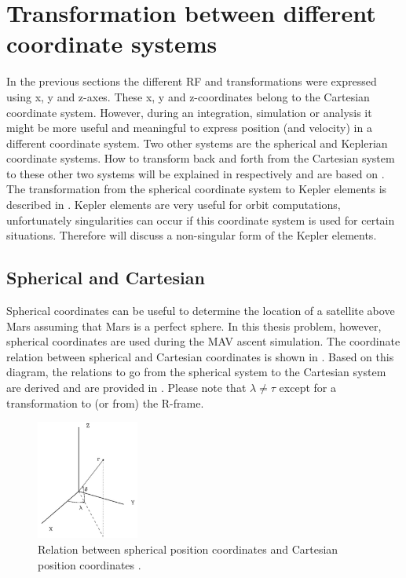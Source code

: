 \section{Transformation between different coordinate systems}
\label{sec:transsys}
In the previous sections the different \ac{RF} and transformations were expressed using x, y and z-axes. These x, y and z-coordinates belong to the Cartesian coordinate system. However, during an integration, simulation or analysis it might be more useful and meaningful to express position (and velocity) in a different coordinate system. Two other systems are the spherical and Keplerian coordinate systems. How to transform back and forth from the Cartesian system to these other two systems will be explained in  respectively and are based on \cite{noomen2013basic}. The transformation from the spherical coordinate system to Kepler elements is described in . Kepler elements are very useful for orbit computations, unfortunately singularities can occur if this coordinate system is used for certain situations. Therefore  will discuss a non-singular form of the Kepler elements. 

\subsection{Spherical and Cartesian}
\label{subsec:sphercart}
Spherical coordinates can be useful to determine the location of a satellite above Mars assuming that Mars is a perfect sphere. In this thesis problem, however, spherical coordinates are used during the \ac{MAV} ascent simulation. The coordinate relation between spherical and Cartesian coordinates is shown in . Based on this diagram, the relations to go from the spherical system to the Cartesian system are derived and are provided in . Please note that $\lambda\neq\tau$ except for a transformation to (or from) the R-frame.

\begin{figure}[!ht]
\centering
\includegraphics[width=0.3\textwidth]{figures/reference_frames/sphertocart_noomen2013basic.jpg}
\caption{Relation between spherical position coordinates and Cartesian position coordinates \citep{noomen2013basic}.}
\label{fig:sphertocart_noomen2013basic}
\end{figure}

